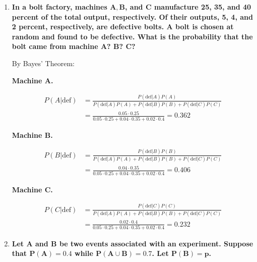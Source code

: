 \documentclass[10pt, oneside]{article}
\begin{document}
\begin{enumerate}[label=3.\arabic*]
\begin{align*}
P\Bigg( HH \Bigg| \bigcap^4_{i=1} H_i \Bigg) &= \frac{ P(\bigcap^4_{i=1} H_i | HH) P(HH) }{ P(\bigcap^4_{i=1} H_i | HH) P(HH) + P(\bigcap^4_{i=1} H_i | HT) P(HT) } \\
&= \frac{1 \cdot 1/3}{1 \cdot 1/3 + 1/16 \cdot 2/3} = \boxed{8/9}
\end{align*}

\item  \begin{tcolorbox}[
  colback=Cerulean!5!white,
  colframe=Cerulean!75!black]
\textbf{In a bolt factory, machines $\bm{A, B}$, and $\bm{C}$ manufacture 25, 35, and 40 percent of the total output, respectively. Of their outputs, 5, 4, and 2 percent, respectively, are defective bolts. A bolt is chosen at random and found to be defective. What is the probability that the bolt came from machine $\bm{A}$? $\bm{B}$? $\bm{C}$?}
\end{tcolorbox}

By Bayes' Theorem:

\textbf{Machine A.}

\begin{align*}
P(A | \text{def}) &= \frac{ P(\text{def} | A) P(A) }{ P(\text{def} | A) P(A) + P(\text{def} | B) P(B) + P(\text{def} | C) P(C) } \\
&= \frac{0.05 \cdot 0.25}{ 0.05 \cdot 0.25 + 0.04 \cdot 0.35 + 0.02 \cdot 0.4 } = \boxed{0.362}
\end{align*}

\textbf{Machine B.}

\begin{align*}
P(B | \text{def}) &= \frac{ P(\text{def} | B) P(B) }{ P(\text{def} | A) P(A) + P(\text{def} | B) P(B) + P(\text{def} | C) P(C) } \\
&= \frac{0.04 \cdot 0.35}{ 0.05 \cdot 0.25 + 0.04 \cdot 0.35 + 0.02 \cdot 0.4 } = \boxed{0.406}
\end{align*}

\textbf{Machine C.}

\begin{align*}
P(C | \text{def}) &= \frac{ P(\text{def} | C) P(C) }{ P(\text{def} | A) P(A) + P(\text{def} | B) P(B) + P(\text{def} | C) P(C) } \\
&= \frac{0.02 \cdot 0.4}{ 0.05 \cdot 0.25 + 0.04 \cdot 0.35 + 0.02 \cdot 0.4 } = \boxed{0.232}
\end{align*}

\item  \begin{tcolorbox}[
  colback=Cerulean!5!white,
  colframe=Cerulean!75!black]
\textbf{Let $\bm{A}$ and $\bm{B}$ be two events associated with an experiment. Suppose that $\bm{P(A) = 0.4}$ while $\bm{P(A \cup B) = 0.7}$. Let $\bm{P(B) = p}$.}
\end{tcolorbox}


\end{enumerate}
\end{document}
